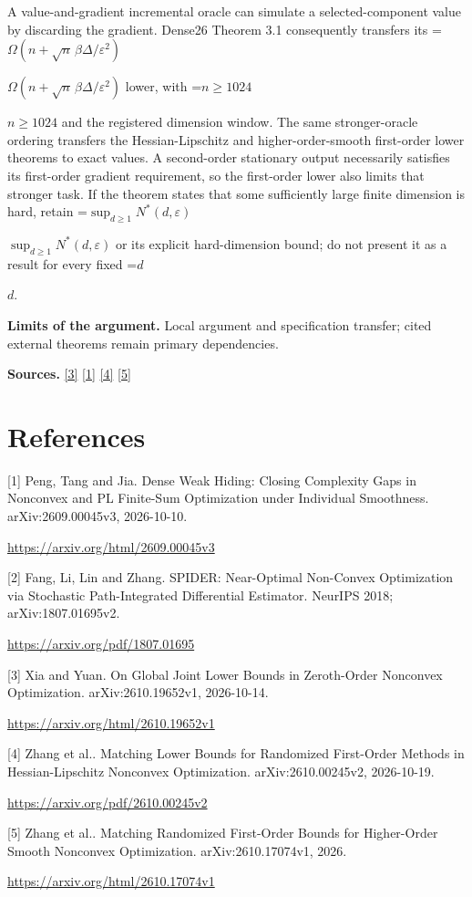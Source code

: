 \documentclass[10pt,a4paper]{article}
\newcommand{\AtlasMath}[1]{\par\begingroup\centering\setbox0=\hbox{$\displaystyle #1$}\ifdim\wd0>1.4\linewidth\typeout{ATLAS WIDE FORMULA: \the\wd0}\fi\ifdim\wd0>\linewidth\resizebox{\linewidth}{!}{\box0}\else\box0\fi\par\endgroup}
\newcommand{\AtlasInlineMath}[1]{\begingroup\setbox0=\hbox{$#1$}\ifdim\wd0>.4\linewidth\endgroup\AtlasMath{#1}\else\endgroup$#1$\fi}
\begin{document}
A value-and-gradient incremental oracle can simulate a selected-component value by discarding the gradient. Dense26 Theorem 3.1 consequently transfers its \AtlasInlineMath{\Omega(n+\sqrt n\,\beta\Delta/\varepsilon^2)} lower, with \AtlasInlineMath{n\ge1024} and the registered dimension window. The same stronger-oracle ordering transfers the Hessian-Lipschitz and higher-order-smooth first-order lower theorems to exact values. A second-order stationary output necessarily satisfies its first-order gradient requirement, so the first-order lower also limits that stronger task. If the theorem states that some sufficiently large finite dimension is hard, retain \AtlasInlineMath{\sup_{d\ge1}N^*(d,\varepsilon)} or its explicit hard-dimension bound; do not present it as a result for every fixed \AtlasInlineMath{d}.

\textbf{Limits of the argument.} Local argument and specification transfer; cited external theorems remain primary dependencies.

\textbf{Sources.} \href{https://arxiv.org/html/2610.19652v1}{[3]} \href{https://arxiv.org/html/2609.00045v3}{[1]} \href{https://arxiv.org/pdf/2610.00245v2}{[4]} \href{https://arxiv.org/html/2610.17074v1}{[5]}

\section{References}
[1] Peng, Tang and Jia. Dense Weak Hiding: Closing Complexity Gaps in Nonconvex and PL Finite-Sum Optimization under Individual Smoothness. arXiv:2609.00045v3, 2026-10-10.

\url{https://arxiv.org/html/2609.00045v3}

[2] Fang, Li, Lin and Zhang. SPIDER: Near-Optimal Non-Convex Optimization via Stochastic Path-Integrated Differential Estimator. NeurIPS 2018; arXiv:1807.01695v2.

\url{https://arxiv.org/pdf/1807.01695}

[3] Xia and Yuan. On Global Joint Lower Bounds in Zeroth-Order Nonconvex Optimization. arXiv:2610.19652v1, 2026-10-14.

\url{https://arxiv.org/html/2610.19652v1}

[4] Zhang et al.. Matching Lower Bounds for Randomized First-Order Methods in Hessian-Lipschitz Nonconvex Optimization. arXiv:2610.00245v2, 2026-10-19.

\url{https://arxiv.org/pdf/2610.00245v2}

[5] Zhang et al.. Matching Randomized First-Order Bounds for Higher-Order Smooth Nonconvex Optimization. arXiv:2610.17074v1, 2026.

\url{https://arxiv.org/html/2610.17074v1}
\end{document}
